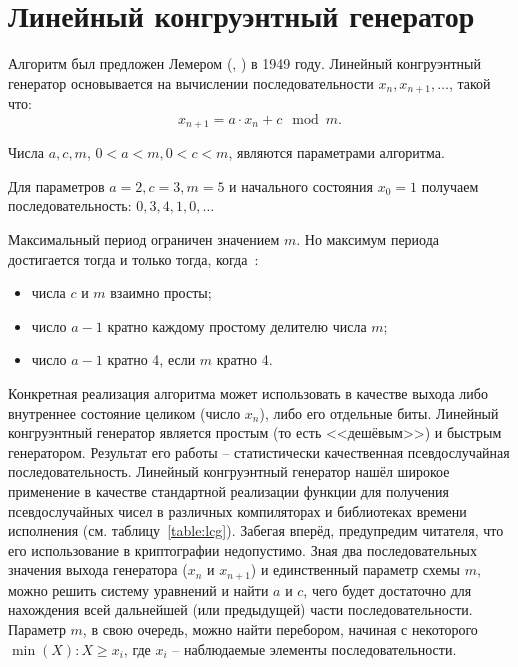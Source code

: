 \section{Линейный конгруэнтный генератор}\label{section-linear-congruential-generator}

Алгоритм был предложен Лемером (, \cite{Lehmer:1951:1, Lehmer:1951:2}) в 1949 году. Линейный конгруэнтный генератор основывается на вычислении последовательности $x_n, x_{n+1}, \dots$, такой что:
	\[x_{n+1} = a \cdot x_n + c \mod m.\]

Числа $a, c, m$, $ 0 < a < m, 0 < c < m$, являются параметрами алгоритма.

\example
Для параметров $a = 2, c = 3, m = 5$ и начального состояния $x_0 = 1$ получаем последовательность: $0, 3, 4, 1, 0, \dots$
\exampleend

Максимальный период ограничен значением $m$. Но максимум периода достигается тогда и только тогда, когда~\cite[Линейный конгруэнтный метод]{Knuth:2001:2}:

\begin{itemize}
	\item числа $c$ и $m$ взаимно просты;
	\item число $a - 1$ кратно каждому простому делителю числа $m$;
	\item число $a - 1$ кратно 4, если $m$ кратно 4.
\end{itemize}

Конкретная реализация алгоритма может использовать в качестве выхода либо внутреннее состояние целиком (число $x_n$), либо его отдельные биты. Линейный конгруэнтный генератор является простым (то есть <<дешёвым>>) и быстрым генератором. Результат его работы -- статистически качественная псевдослучайная последовательность. Линейный конгруэнтный генератор нашёл широкое применение в качестве стандартной реализации функции для получения псевдослучайных чисел в различных компиляторах и библиотеках времени исполнения (см. таблицу~\ref{table:lcg}). Забегая вперёд, предупредим читателя, что его использование в криптографии недопустимо. Зная два последовательных значения выхода генератора ($x_n$ и $x_{n+1}$) и единственный параметр схемы $m$, можно решить систему уравнений и найти $a$ и $c$, чего будет достаточно для нахождения всей дальнейшей (или предыдущей) части последовательности. Параметр $m$, в свою очередь, можно найти перебором, начиная с некоторого $\min(X): X \geq x_i$, где $x_i$ -- наблюдаемые элементы последовательности.

